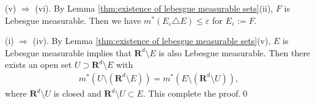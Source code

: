 \documentclass{book}
\theoremstyle{defstyle}
\theoremstyle{thmstyle}
\begin{document}
(v) $\Rightarrow$ (vi). By Lemma \ref{thm:existence of lebesgue measurable sets}(ii), $F$ is Lebesgue measurable. Then we have $m^*(E_\varepsilon \triangle E) \leq \varepsilon$ for $E_\varepsilon := F$.

(i) $\Rightarrow$ (iv). By Lemma \ref{thm:existence of lebesgue measurable sets}(v), $E$ is Lebesgue measurable implies that $\mathbf{R}^d \setminus E$ is also Lebesgue measurable. Then there exists an open set $U \supset \mathbf{R}^d \setminus E$ with
    \begin{align*}
        m^*(U \setminus (\mathbf{R}^d \setminus E))
        = m^*(E \setminus (\mathbf{R}^d \setminus U)),
    \end{align*}
where $\mathbf{R}^d \setminus U$ is closed and $\mathbf{R}^d \setminus U \subset E$. This complete the proof.\qed
\end{document}
